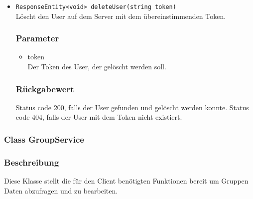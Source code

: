 \documentclass[a4paper]{scrreprt}
\begin{document}
\begin{addmargin}[25pt]{0pt}
\begin{itemize}
\item \texttt{ResponseEntity<void> deleteUser(string token)}\\
	Löscht den User auf dem Server mit dem übereinstimmenden Token.

	\subsubsection*{Parameter}
	\begin{itemize}
	\item token \\
		Der Token des User, der gelöscht werden soll.
	\end{itemize}

	\subsubsection*{Rückgabewert}
	Status code 200, falls der User gefunden und gelöscht werden konnte.
	Status code 404, falls der User mit dem Token nicht existiert.
	
\end{itemize}
\end{addmargin}


\subsubsection{Class GroupService}
\subsubsection*{Beschreibung}
Diese Klasse stellt die für den Client benötigten Funktionen bereit um Gruppen Daten abzufragen und zu bearbeiten. 
\end{document}
